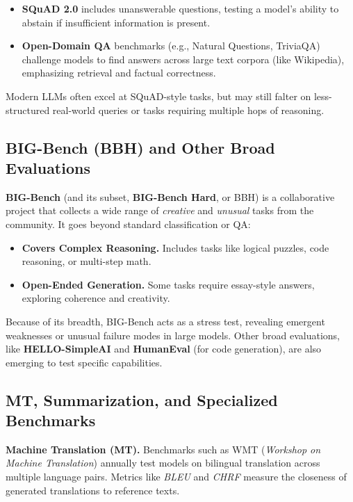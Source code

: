 \begin{itemize}
    \item \textbf{SQuAD 2.0} includes unanswerable questions, testing a model’s ability to abstain if insufficient information is present.
    \item \textbf{Open-Domain QA} benchmarks (e.g., Natural Questions, TriviaQA) challenge models to find answers across large text corpora (like Wikipedia), emphasizing retrieval and factual correctness.
\end{itemize}

\noindent
Modern LLMs often excel at SQuAD-style tasks, but may still falter on less-structured real-world queries or tasks requiring multiple hops of reasoning.

\subsection{BIG-Bench (BBH) and Other Broad Evaluations}
\noindent
\textbf{BIG-Bench} (and its subset, \textbf{BIG-Bench Hard}, or BBH) \cite{srivastava2022beyond} is a collaborative project that collects a wide range of \emph{creative} and \emph{unusual} tasks from the community. It goes beyond standard classification or QA:
\begin{itemize}
    \item \textbf{Covers Complex Reasoning.} Includes tasks like logical puzzles, code reasoning, or multi-step math.
    \item \textbf{Open-Ended Generation.} Some tasks require essay-style answers, exploring coherence and creativity.
\end{itemize}

\noindent
Because of its breadth, BIG-Bench acts as a stress test, revealing emergent weaknesses or unusual failure modes in large models. Other broad evaluations, like \textbf{HELLO-SimpleAI} and \textbf{HumanEval} (for code generation), are also emerging to test specific capabilities.

\subsection{MT, Summarization, and Specialized Benchmarks}
\noindent
\textbf{Machine Translation (MT).} Benchmarks such as WMT (\emph{Workshop on Machine Translation}) annually test models on bilingual translation across multiple language pairs. Metrics like \textit{BLEU} and \textit{CHRF} measure the closeness of generated translations to reference texts.

